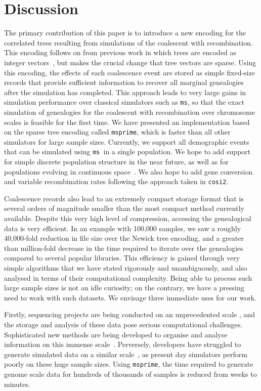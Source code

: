 \documentclass[10pt]{article}
\newcommand{\ms}[0]{\texttt{ms}}
\newcommand{\msprime}[0]{\texttt{msprime}}
\newcommand{\cosi}[0]{\texttt{cosi2}}
\begin{document}
\section{Discussion}
\label{sec-discussion}

The primary contribution of this paper is to introduce a new encoding for the
correlated trees resulting from simulations of the coalescent with
recombination. This encoding follows on from previous work in which trees are
encoded as integer vectors~\citep{kbe13,keb14}, but makes the crucial change
that tree vectors are sparse. Using this encoding, the effects of each
coalescence event are stored as simple fixed-size records that provide
sufficient information to recover all marginal genealogies after the simulation has
completed. This approach leads to very large gains in simulation performance
over classical simulators such as \ms, so that the exact simulation of
genealogies for the coalescent with recombination over chromosome scales is
feasible for the first time. We have presented an implementation based on the
sparse tree encoding called \msprime, which is faster than all other simulators
for large sample sizes. Currently, we support all demographic events that can
be simulated using \ms\ in a single population. We hope to add support for
simple discrete population structure in the near future, as well as for
populations evolving in continuous space~\citep{bev10,bke10,bev13}. We also
hope to add gene conversion~\citep{wh00} and variable recombination rates
following the approach taken in \cosi.

Coalescence records also lead to an extremely compact storage format that is
several orders of magnitude smaller than the most compact method currently
available. Despite this very high level of compression, accessing the
genealogical data is very efficient. In an example with 100,000 samples, we saw
a roughly 40,000-fold reduction in file size over the Newick tree encoding, and
a greater than million-fold decrease in the time required to iterate over the
genealogies compared to several popular libraries. This efficiency is gained
through very simple algorithms that we have stated rigorously and unambiguously,
and also analysed in terms of their computational complexity. Being able to
process such large sample sizes is not an idle curiosity; on the contrary, we have a
pressing need to work with such datasets. We envisage three immediate
uses for our work.

Firstly, sequencing projects are being conducted on an unprecedented
scale \citep{gn14,u15,1k15,ghgz15,e15,slfc15}, and the storage and analysis of
these data pose serious computational challenges. Sophisticated new methods are
being developed to organise and analyse information on this immense
scale~\citep{d14,l15,lkkq15}. Perversely, developers have struggled to generate
simulated data on a similar scale~\citep{d14,lkkq15}, as present day simulators
perform poorly on these huge sample sizes. Using \msprime, the time required to
generate genome scale data for hundreds of thousands of samples is reduced from
weeks to minutes.
\end{document}

